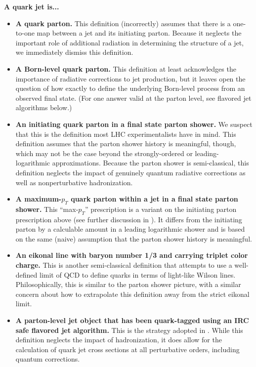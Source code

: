 \documentclass[11pt]{cernrep}
\begin{document}
\noindent \textbf{A quark jet is...}
\begin{itemize}
\item \textbf{A quark parton.}  This definition (incorrectly) assumes that there is a one-to-one map between a jet and its initiating parton.  Because it neglects the important role of additional radiation in determining the structure of a jet, we immediately dismiss this definition.
\item \textbf{A Born-level quark parton.}  This definition at least acknowledges the importance of radiative corrections to jet production, but it leaves open the question of how exactly to define the underlying Born-level process from an observed final state.  (For one answer valid at the parton level, see flavored jet algorithms below.)
\item \textbf{An initiating quark parton in a final state parton
    shower.}  We suspect that this is the definition most LHC
  experimentalists have in mind.  This definition assumes that the parton shower history is meaningful, though,
  which may not be the case beyond the strongly-ordered or
  leading-logarithmic approximations.  Because the parton shower is
  semi-classical, this definition neglects the impact of genuinely
  quantum radiative corrections as well as nonperturbative
  hadronization.
\item \textbf{A maximum-$p_T$ quark parton within a jet in a final state parton shower.}  This ``max-$p_T$'' prescription is a variant on the initiating parton prescription above (see further discussion in \cite{Buckley:2015gua}).  It differs from the initiating parton by a calculable amount in a leading logarithmic shower \cite{Dasgupta:2014yra} and is based on the same (naive) assumption that the parton shower history is meaningful. 
\item \textbf{An eikonal line with baryon number 1/3 and carrying triplet color charge.}  This is another semi-classical definition that attempts to use a well-defined limit of QCD to define quarks in terms of light-like Wilson lines.  Philosophically, this is similar to the parton shower picture, with a similar concern about how to extrapolate this definition away from the strict eikonal limit.
\item \textbf{A parton-level jet object that has been quark-tagged using an IRC safe flavored jet algorithm.}  This is the strategy adopted in \cite{Banfi:2006hf}.  While this definition neglects the impact of hadronization, it does allow for the calculation of quark jet cross sections at all perturbative orders, including quantum corrections.
\end{itemize}
\end{document}
